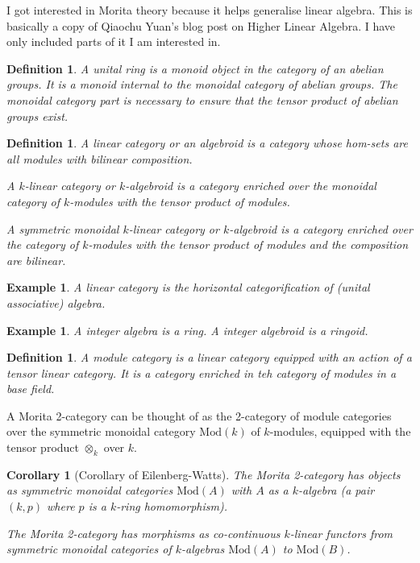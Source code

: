 \documentclass{tufte-book}
\newtheorem{definition}[theorem]{Definition}
\newtheorem{example}[theorem]{Example}
\newtheorem{corollary}[theorem]{Corollary}
\begin{document}
I got interested in Morita theory because it helps generalise linear algebra. This is basically a copy of Qiaochu Yuan's blog post on Higher Linear Algebra. I have only included parts of it I am interested in.

\begin{definition}
	A unital ring is a monoid object in the category of an abelian groups. It is a monoid internal to the monoidal category of abelian groups. The monoidal category part is necessary to ensure that the tensor product of abelian groups exist.
\end{definition}

\begin{definition}
	A linear category or an algebroid is a category whose hom-sets are all modules with bilinear composition.

	A $k$-linear category or $k$-algebroid is a category enriched over the monoidal category of $k$-modules with the tensor product of modules.

	A symmetric monoidal $k$-linear category or $k$-algebroid is a category enriched over the category of $k$-modules with the tensor product of modules and the composition are bilinear. 
\end{definition}

\begin{example}
	A linear category is the horizontal categorification of (unital associative) algebra.
\end{example}

\begin{example}
	A integer algebra is a ring. A integer algebroid is a ringoid.
\end{example}

\begin{definition}
	A module category is a linear category equipped with an action of a tensor linear category. It is a category enriched in teh category of modules in a base field.
\end{definition}

A Morita 2-category can be thought of as the 2-category of module categories over the symmetric monoidal category $\mathrm{Mod}(k)$ of $k$-modules, equipped with the tensor product $\otimes_k$ over $k$.

\begin{corollary}[Corollary of Eilenberg-Watts]
	The Morita 2-category has objects as symmetric monoidal categories $\mathrm{Mod}(A)$ with $A$ as a $k$-algebra (a pair $(k, p)$ where $p$ is a $k$-ring homomorphism).

	The Morita 2-category has morphisms as co-continuous $k$-linear functors from symmetric monoidal categories of $k$-algebras $\mathrm{Mod}(A)$ to $\mathrm{Mod}(B)$.
\end{corollary}
\end{document}
